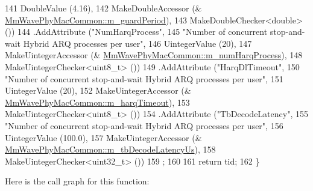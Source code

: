 \begin{DoxyCode}
141                                                          DoubleValue (4.16),
142                                                          MakeDoubleAccessor (&
      \hyperlink{classns3_1_1MmWavePhyMacCommon_a0b542dc41bcdbf84e746d2956e36eff1}{MmWavePhyMacCommon::m\_guardPeriod}),
143                                                          MakeDoubleChecker<double> ())
144                  .AddAttribute (\textcolor{stringliteral}{"NumHarqProcess"},
145                                                          \textcolor{stringliteral}{"Number of concurrent stop-and-wait Hybrid ARQ
       processes per user"},
146                                                          UintegerValue (20),
147                                                          MakeUintegerAccessor (&
      \hyperlink{classns3_1_1MmWavePhyMacCommon_a3db39d6fac0cc4b1a922a06fc0461d0e}{MmWavePhyMacCommon::m\_numHarqProcess}),
148                                                          MakeUintegerChecker<uint8\_t> ())
149                  .AddAttribute (\textcolor{stringliteral}{"HarqDlTimeout"},
150                                                          \textcolor{stringliteral}{"Number of concurrent stop-and-wait Hybrid ARQ
       processes per user"},
151                                                          UintegerValue (20),
152                                                          MakeUintegerAccessor (&
      \hyperlink{classns3_1_1MmWavePhyMacCommon_aefa63501ca7b8e7086beac5fdd05974f}{MmWavePhyMacCommon::m\_harqTimeout}),
153                                                          MakeUintegerChecker<uint8\_t> ())
154                  .AddAttribute (\textcolor{stringliteral}{"TbDecodeLatency"},
155                                                                          \textcolor{stringliteral}{"Number of concurrent
       stop-and-wait Hybrid ARQ processes per user"},
156                                                                          UintegerValue (100.0),
157                                                                          MakeUintegerAccessor (&
      \hyperlink{classns3_1_1MmWavePhyMacCommon_ab6cf13ebe59c6b88f6c2bb58ea6535a8}{MmWavePhyMacCommon::m\_tbDecodeLatencyUs}),
158                                                                          MakeUintegerChecker<uint32\_t> ())
159         ;
160 
161         \textcolor{keywordflow}{return} tid;
162 \}
\end{DoxyCode}


Here is the call graph for this function\+:


